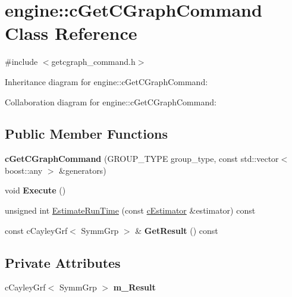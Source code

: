 \hypertarget{classengine_1_1cGetCGraphCommand}{\section{engine\-:\-:c\-Get\-C\-Graph\-Command Class Reference}
\label{classengine_1_1cGetCGraphCommand}
}


{\ttfamily \#include $<$getcgraph\-\_\-command.\-h$>$}



Inheritance diagram for engine\-:\-:c\-Get\-C\-Graph\-Command\-:


Collaboration diagram for engine\-:\-:c\-Get\-C\-Graph\-Command\-:
\subsection*{Public Member Functions}
\begin{DoxyCompactItemize}
\item 
\hypertarget{classengine_1_1cGetCGraphCommand_a7fad17f3378da72ef8663f2587466bcc}{{\bfseries c\-Get\-C\-Graph\-Command} (G\-R\-O\-U\-P\-\_\-\-T\-Y\-P\-E group\-\_\-type, const std\-::vector$<$ boost\-::any $>$ \&generators)}\label{classengine_1_1cGetCGraphCommand_a7fad17f3378da72ef8663f2587466bcc}

\item 
\hypertarget{classengine_1_1cGetCGraphCommand_a94b83bc4b3103138411ec5bf1ccca84c}{void {\bfseries Execute} ()}\label{classengine_1_1cGetCGraphCommand_a94b83bc4b3103138411ec5bf1ccca84c}

\item 
unsigned int \hyperlink{classengine_1_1cGetCGraphCommand_a0a3d07c4f82227b7f0ffbcf01f7fcec2}{Estimate\-Run\-Time} (const \hyperlink{classengine_1_1cEstimator}{c\-Estimator} \&estimator) const 
\item 
\hypertarget{classengine_1_1cGetCGraphCommand_a3c7ed9c9d402c1004c5114e10c55b759}{const c\-Cayley\-Grf$<$ Symm\-Grp $>$ \& {\bfseries Get\-Result} () const }\label{classengine_1_1cGetCGraphCommand_a3c7ed9c9d402c1004c5114e10c55b759}

\end{DoxyCompactItemize}
\subsection*{Private Attributes}
\begin{DoxyCompactItemize}
\item 
\hypertarget{classengine_1_1cGetCGraphCommand_ab815ffa24d00a0c326068b7f41ca28c1}{c\-Cayley\-Grf$<$ Symm\-Grp $>$ {\bfseries m\-\_\-\-Result}}\label{classengine_1_1cGetCGraphCommand_ab815ffa24d00a0c326068b7f41ca28c1}

\end{DoxyCompactItemize}
